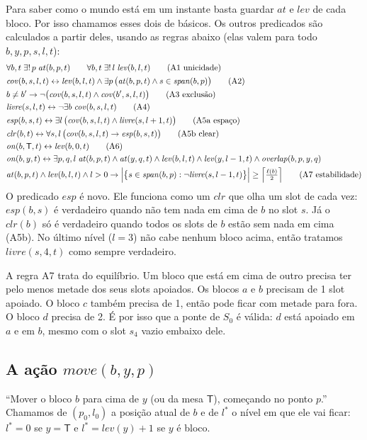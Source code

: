 \documentclass[11pt,a4paper]{article}
\newcommand{\clr}{\mathit{clr}}
\newcommand{\at}{\mathit{at}}
\newcommand{\lev}{\mathit{lev}}
\newcommand{\cov}{\mathit{cov}}
\newcommand{\livre}{\mathit{livre}}
\newcommand{\esp}{\mathit{esp}}
\newcommand{\on}{\mathit{on}}
\newcommand{\mv}{\mathit{move}}
\newcommand{\spn}{\mathit{span}}
\newcommand{\ov}{\mathit{overlap}}
\newcommand{\mesaT}{\mathsf{T}}
\begin{document}
\noindent Para saber como o mundo está em um instante basta guardar $\at$ e $\lev$
de cada bloco. Por isso chamamos esses dois de básicos. Os outros predicados são
calculados a partir deles, usando as regras abaixo (elas valem para todo
$b,y,p,s,l,t$):
\begin{align}
&\forall b,t\;\exists!\,p\;\at(b,p,t) \qquad \forall b,t\;\exists!\,l\;\lev(b,l,t)
  \tag{A1 unicidade}\\
&\cov(b,s,l,t) \leftrightarrow \lev(b,l,t)\land\exists p\,
  \bigl(\at(b,p,t)\land s\in\spn(b,p)\bigr) \tag{A2}\\
&b\neq b' \rightarrow \lnot\bigl(\cov(b,s,l,t)\land\cov(b',s,l,t)\bigr)
  \tag{A3 exclusão}\\
&\livre(s,l,t) \leftrightarrow \lnot\exists b\;\cov(b,s,l,t) \tag{A4}\\
&\esp(b,s,t) \leftrightarrow \exists l\,\bigl(\cov(b,s,l,t)\land
  \livre(s,l+1,t)\bigr) \tag{A5a espaço}\\
&\clr(b,t) \leftrightarrow \forall s,l\,\bigl(\cov(b,s,l,t)\rightarrow
  \esp(b,s,t)\bigr) \tag{A5b clear}\\
&\on(b,\mesaT,t) \leftrightarrow \lev(b,0,t) \tag{A6}\\
&\on(b,y,t) \leftrightarrow \exists p,q,l\;\at(b,p,t)\land\at(y,q,t)\land
  \lev(b,l,t)\land\lev(y,l-1,t)\land\ov(b,p,y,q) \notag\\
&\at(b,p,t)\land\lev(b,l,t)\land l>0 \rightarrow
  \Bigl|\bigl\{s\in\spn(b,p):\lnot\livre(s,l-1,t)\bigr\}\Bigr|
  \ge\Bigl\lceil\tfrac{\ell(b)}{2}\Bigr\rceil \tag{A7 estabilidade}
\end{align}
O predicado $\esp$ é novo. Ele funciona como um $\clr$ que olha um slot de cada vez:
$\esp(b,s)$ é verdadeiro quando não tem nada em cima de $b$ no slot $s$. Já o
$\clr(b)$ só é verdadeiro quando todos os slots de $b$ estão sem nada em cima
(A5b). No último nível ($l=3$) não cabe nenhum bloco acima, então tratamos
$\livre(s,4,t)$ como sempre verdadeiro.

A regra A7 trata do equilíbrio. Um bloco que está em cima de outro precisa ter pelo
menos metade dos seus slots apoiados. Os blocos $a$ e $b$ precisam de 1 slot
apoiado. O bloco $c$ também precisa de 1, então pode ficar com metade para fora. O
bloco $d$ precisa de 2. É por isso que a ponte de $S_0$ é válida: $d$ está apoiado
em $a$ e em $b$, mesmo com o slot $s_4$ vazio embaixo dele.

\subsection{A ação \texorpdfstring{$\mv(b,y,p)$}{move(b,y,p)}}
``Mover o bloco $b$ para cima de $y$ (ou da mesa $\mesaT$), começando no ponto $p$.''
Chamamos de $(p_0,l_0)$ a posição atual de $b$ e de $l^\ast$ o nível em que ele
vai ficar:
$l^\ast=0$ se $y=\mesaT$ e $l^\ast=\lev(y)+1$ se $y$ é bloco.
\end{document}
